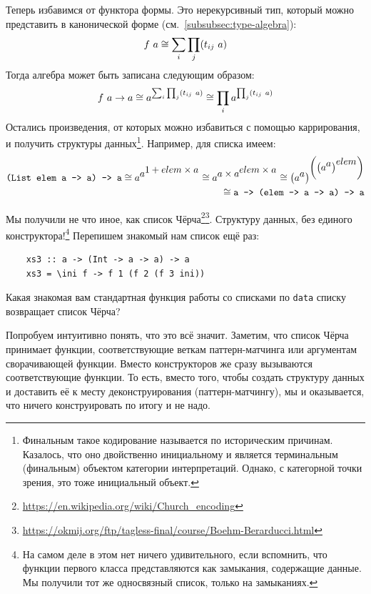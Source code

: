 Теперь избавимся от функтора формы.
Это нерекурсивный тип, который можно представить в канонической форме (см.~\ref{subsubsec:type-algebra}):
\[
    f~ a \cong \sum_{i}\prod_{j} (t_{ij}~ a)
\]
Тогда алгебра может быть записана следующим образом:
\[
    f~ a\to a\cong a^{\sum_{i}\prod_{j} (t_{ij}~ a)} \cong \prod_{i}a^{\prod_{j} (t_{ij}~ a)}
\]
Остались произведения, от которых можно избавиться с помощью каррирования, и получить  структуры данных\footnote{Финальным такое кодирование называется по историческим причинам. Казалось, что оно двойственно инициальному и является терминальным (финальным) объектом категории интерпретаций. Однако, с категорной точки зрения, это тоже инициальный объект.}.
Например, для списка имеем:
\begin{align*}
    \text{\texttt{(List elem a -> a) -> a}}
    \cong a^{\displaystyle a^{\displaystyle 1 + elem\times a}}
    \cong a^{\displaystyle a\times a^{\displaystyle elem\times a}}
    \cong \left( a^{\displaystyle a} \right)^{\displaystyle \left(\left( a^{\displaystyle a}\right)^{\displaystyle elem}\right)} \\
    \cong \text{\texttt{a -> (elem -> a -> a) -> a}}
\end{align*}

Мы получили не что иное, как список Чёрча\footnote{\url{https://en.wikipedia.org/wiki/Church_encoding}}\footnote{\url{https://okmij.org/ftp/tagless-final/course/Boehm-Berarducci.html}}.
Структуру данных, без единого конструктора!\footnote{На самом деле в этом нет ничего удивительного, если вспомнить, что функции первого класса представляются как замыкания, содержащие данные. Мы получили тот же односвязный список, только на замыканиях.}
Перепишем знакомый нам список ещё раз:
\begin{verbatim}
    xs3 :: a -> (Int -> a -> a) -> a
    xs3 = \ini f -> f 1 (f 2 (f 3 ini))
\end{verbatim}

\begin{task}
    Какая знакомая вам стандартная функция работы со списками по \texttt{data} списку возвращает список Чёрча?
\end{task}

Попробуем интуитивно понять, что это всё значит.
Заметим, что список Чёрча принимает функции, соответствующие веткам паттерн-матчинга или аргументам сворачивающей функции.
Вместо конструкторов же сразу вызываются соответствующие функции.
То есть, вместо того, чтобы создать структуру данных и доставить её к месту деконструирования (паттерн-матчингу), мы  и оказывается, что ничего конструировать по итогу и не надо.

